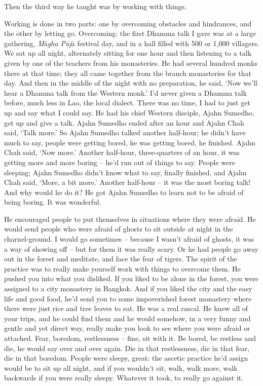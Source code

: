 Then the third way he taught was by working with things. 

Working is done in two parts: one by overcoming obstacles and
hindrances, and the other by letting go. Overcoming: the first Dhamma
talk I gave was at a large gathering, \emph{M}ā\emph{gha Pūj}ā festival
day, and in a hall filled with 500 or 1,000 villagers. We sat up all
night, alternately sitting for one hour and then listening to a talk
given by one of the teachers from his monasteries. He had several
hundred monks there at that time; they all came together from the branch
monasteries for that day. And then in the middle of the night with no
preparation, he said, `Now we'll hear a Dhamma talk from the Western
monk.' I'd never given a Dhamma talk before, much less in Lao, the local
dialect. There was no time, I had to just get up and say what I could
say. He had his chief Western disciple, Ajahn Sumedho, get up and give a
talk. Ajahn Sumedho ended after an hour and Ajahn Chah said, `Talk
more.' So Ajahn Sumedho talked another half-hour; he didn't have much to
say, people were getting bored, he was getting bored, he finished. Ajahn
Chah said, `Now more.' Another half-hour, three-quarters of an hour, it
was getting more and more boring -- he'd run out of things to say. 
People were sleeping; Ajahn Sumedho didn't know what to say, finally
finished, and Ajahn Chah said, `More, a bit more.' Another half-hour
-- it was the most boring talk! And why would he do it? He got Ajahn
Sumedho to learn not to be afraid of being boring. It was wonderful. 

He encouraged people to put themselves in situations where they were
afraid. He would send people who were afraid of ghosts to sit outside at
night in the charnel-ground. I would go sometimes -- because I wasn't
afraid of ghosts, it was a way of showing off -- but for them it was
really scary. Or he had people go away out in the forest and meditate, 
and face the fear of tigers. The spirit of the practice was to really
make yourself work with things to overcome them. He pushed you into what
you disliked. If you liked to be alone in the forest, you were assigned
to a city monastery in Bangkok. And if you liked the city and the easy
life and good food, he'd send you to some impoverished forest monastery
where there were just rice and tree leaves to eat. He was a real rascal. 
He knew all of your trips, and he could find them and he would somehow, 
in a very funny and gentle and yet direct way, really make you look to
see where you were afraid or attached. Fear, boredom, restlessness --
fine, sit with it. Be bored, be restless and die, he would say over and
over again. Die in that restlessness, die in that fear, die in that
boredom. People were sleepy, great: the ascetic practice he'd assign
would be to sit up all night, and if you wouldn't sit, walk, walk more, 
walk backwards if you were really sleepy. Whatever it took, to really go
against it. 

